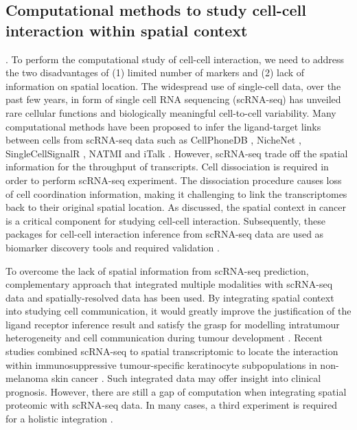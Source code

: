 \subsection{Computational methods to study cell-cell interaction within spatial context}
\label{Chap1:Sub_Computational}. 
To perform the computational study of cell-cell interaction, we need to address the two disadvantages of (1) limited number of markers and (2) lack of information on spatial location. The widespread use of single-cell data, over the past few years, in form of single cell RNA sequencing (scRNA-seq) has unveiled rare cellular functions and biologically meaningful cell-to-cell variability. Many computational methods have been proposed to infer the ligand-target links between cells  from scRNA-seq data such as CellPhoneDB \cite{efremova2020cellphonedb}, NicheNet \cite{browaeys2020nichenet}, SingleCellSignalR \cite{cabello2020singlecellsignalr}, NATMI \cite{hou2020predicting} and iTalk \cite{wang2019italk}. However, scRNA-seq trade off the spatial information for the  throughput of transcripts. Cell dissociation is required in order to perform scRNA-seq experiment. The dissociation procedure causes loss of cell coordination information, making it challenging to link the transcriptomes back to their original spatial location. As discussed, the spatial context in cancer is a critical component for studying cell-cell interaction. Subsequently, these packages for cell-cell interaction inference from scRNA-seq data are used as biomarker discovery tools and required validation \cite{de2020unraveling}. 

To overcome the lack of spatial information from scRNA-seq prediction, complementary approach that integrated multiple modalities with scRNA-seq data and spatially-resolved data has been used. By integrating spatial context into studying cell communication, it would greatly improve the justification of the ligand receptor inference result and satisfy the grasp for modelling intratumour heterogeneity and cell communication during tumour development \cite{crosetto2015spatially, pages2010immune, marusyk2012intra,bedard2013tumour}. Recent studies combined scRNA-seq to spatial transcriptomic to locate the interaction within immunosuppressive tumour-specific keratinocyte subpopulations in non-melanoma skin cancer \cite{ji2020multimodal}. Such integrated data may offer insight into clinical prognosis. However, there are still a gap of computation when integrating spatial proteomic with scRNA-seq data. In many cases, a third experiment is required for a holistic integration \cite{ji2020multimodal, schulz2018simultaneous, govek2021single}.    

